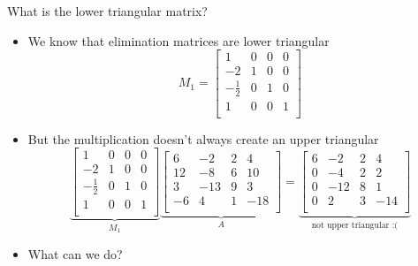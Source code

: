 \documentclass[10pt]{beamer}
\begin{document}
\begin{frame}{What is the lower triangular matrix?}
    \begin{itemize}
        \item We know that elimination matrices are lower triangular 
        $$
        M_1=    \begin{bmatrix}
    1 & 0 & 0 & 0\\
    -2 & 1 & 0 & 0\\
    -\frac{1}{2} & 0 & 1 & 0\\
    1 & 0 & 0 & 1\\
    \end{bmatrix}
    $$

    \item<2-> But the multiplication doesn't always create an upper triangular 
    $$\underbrace{
    \begin{bmatrix}
    1 & 0 & 0 & 0\\
    -2 & 1 & 0 & 0\\
    -\frac{1}{2} & 0 & 1 & 0\\
    1 & 0 & 0 & 1\\
    \end{bmatrix}}_{M_1}
    \underbrace{\begin{bmatrix}
    \boxed{6} & -2 & 2 & 4\\
    12 & -8 & 6 & 10\\
    3 & -13 & 9 & 3\\
    -6 & 4 & 1 & -18\\
    \end{bmatrix}}_{A} = 
    \underbrace{
    \begin{bmatrix}
    6 & -2 & 2 & 4\\
    0 & -4 & 2 & 2\\
    0 & -12 & 8 & 1\\
    0 & 2 & 3 & -14\\
    \end{bmatrix}}_{\text{not upper triangular :(}}
    $$
    \item<3-> What can we do?
    \end{itemize}
\end{frame}

\end{document}
